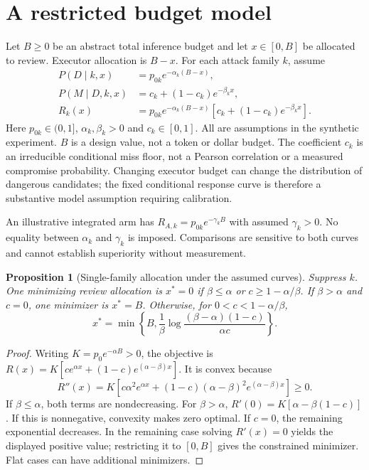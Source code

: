 \documentclass[11pt]{article}
\newtheorem{proposition}{Proposition}
\begin{document}
\section{A restricted budget model}
Let $B\geq0$ be an abstract total inference budget and let $x\in[0,B]$
be allocated to review. Executor allocation is $B-x$.
For each attack family $k$, assume
\begin{align}
 P(D\mid k,x)&=p_{0k}e^{-\alpha_k(B-x)},\\
 P(M\mid D,k,x)&=c_k+(1-c_k)e^{-\beta_k x},\\
 R_k(x)&=p_{0k}e^{-\alpha_k(B-x)}
          [c_k+(1-c_k)e^{-\beta_k x}].
\end{align}
Here $p_{0k}\in(0,1]$, $\alpha_k,\beta_k>0$ and $c_k\in[0,1]$.
All are assumptions in the synthetic experiment. $B$ is a design value,
not a token or dollar budget. The coefficient $c_k$ is an irreducible
conditional miss floor, not a Pearson correlation or a measured compromise
probability. Changing executor budget can change the distribution of dangerous
candidates; the fixed conditional response curve is therefore a substantive
model assumption requiring calibration.

An illustrative integrated arm has
$R_{A,k}=p_{0k}e^{-\gamma_k B}$ with assumed $\gamma_k>0$.
No equality between $\alpha_k$ and $\gamma_k$ is imposed. Comparisons are
sensitive to both curves and cannot establish superiority without measurement.

\begin{proposition}[Single-family allocation under the assumed curves]
Suppress $k$. One minimizing review allocation is $x^*=0$ if
$\beta\leq\alpha$ or $c\geq1-\alpha/\beta$.
If $\beta>\alpha$ and $c=0$, one minimizer is $x^*=B$.
Otherwise, for $0<c<1-\alpha/\beta$,
\[
 x^*=\min\left\{B,\frac{1}{\beta}
       \log\frac{(\beta-\alpha)(1-c)}{\alpha c}\right\}.
\]
\end{proposition}
\begin{proof}
Writing $K=p_0e^{-\alpha B}>0$, the objective is
$R(x)=K[ce^{\alpha x}+(1-c)e^{(\alpha-\beta)x}]$.
It is convex because
\[
 R''(x)=K[c\alpha^2e^{\alpha x}
 +(1-c)(\alpha-\beta)^2e^{(\alpha-\beta)x}]\geq0.
\]
If $\beta\leq\alpha$, both terms are nondecreasing.
For $\beta>\alpha$, $R'(0)=K[\alpha-\beta(1-c)]$.
If this is nonnegative, convexity makes zero optimal. If $c=0$,
the remaining exponential decreases. In the remaining case solving
$R'(x)=0$ yields the displayed positive value; restricting it to $[0,B]$
gives the constrained minimizer. Flat cases can have additional minimizers.
\end{proof}
\end{document}
